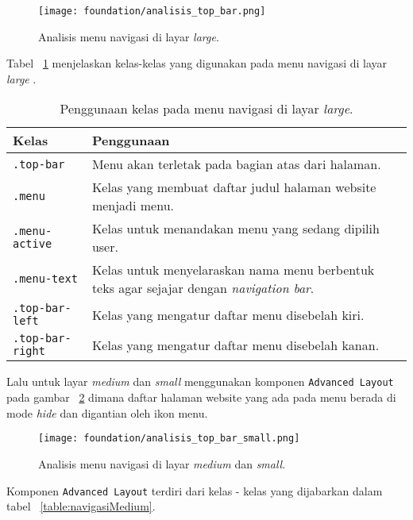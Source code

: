 \begin{figure} [H]
	\centering  
	\texttt{[image: foundation/analisis\_top\_bar.png]}  
	\caption{Analisis menu navigasi di layar \textit{large}.} 
	\label{fig:navigasiLarge}
\end{figure}
Tabel ~\ref{table:navigasiLarge} menjelaskan kelas-kelas yang digunakan pada menu navigasi di layar \textit{large} .\\
\begin{table}[H]
	\centering
	\caption{Penggunaan kelas pada menu navigasi di layar \textit{large}.}
	\begin{tabularx}{\textwidth}{lX}
		\toprule
		Kelas     & Penggunaan \\
		\midrule
		\texttt{.top-bar}	 & Menu akan terletak pada bagian atas dari halaman.\\	
		\texttt{.menu}	 & Kelas yang membuat daftar judul halaman website menjadi menu.\\
		\texttt{.menu-active} & Kelas untuk menandakan menu yang sedang dipilih user.\\
		\texttt{.menu-text} & Kelas untuk menyelaraskan nama menu berbentuk teks agar sejajar dengan \textit{navigation bar}.\\	
		\texttt{.top-bar-left} & Kelas yang mengatur daftar menu disebelah kiri.\\
		\texttt{.top-bar-right} & Kelas yang mengatur daftar menu disebelah kanan.\\
		\bottomrule
	\end{tabularx}%
	\label{table:navigasiLarge}
\end{table}%

\noindent Lalu untuk layar \textit{medium} dan \textit{small} menggunakan komponen \texttt{Advanced Layout} pada gambar ~\ref{fig:navigasiMedium} dimana  daftar halaman website yang ada pada menu berada di mode \textit{hide} dan digantian oleh ikon menu. 

\begin{figure} [H]
	\centering  
	\texttt{[image: foundation/analisis\_top\_bar\_small.png]} 
	\caption{Analisis menu navigasi di layar \textit{medium} dan \textit{small}.} 
	\label{fig:navigasiMedium}
\end{figure} \noindent

Komponen \texttt{Advanced Layout} terdiri dari kelas - kelas yang dijabarkan dalam tabel ~\ref{table:navigasiMedium}.\\

